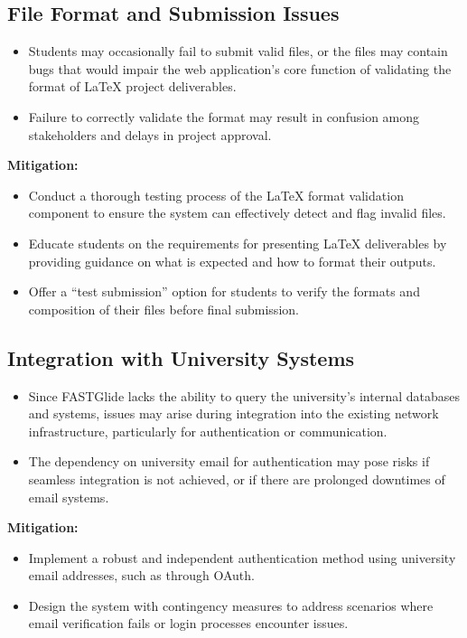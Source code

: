 \documentclass{FastFyp}
\begin{document}
\subsection{File Format and Submission Issues}
\begin{itemize}
    \item Students may occasionally fail to submit valid files, or the files may contain bugs that would impair the web application's core function of validating the format of LaTeX project deliverables.
    \item Failure to correctly validate the format may result in confusion among stakeholders and delays in project approval.
\end{itemize}
\textbf{Mitigation:}
\begin{itemize}
    \item Conduct a thorough testing process of the LaTeX format validation component to ensure the system can effectively detect and flag invalid files.
    \item Educate students on the requirements for presenting LaTeX deliverables by providing guidance on what is expected and how to format their outputs.
    \item Offer a “test submission” option for students to verify the formats and composition of their files before final submission.
\end{itemize}

\subsection{Integration with University Systems}
\begin{itemize}
    \item Since FASTGlide lacks the ability to query the university's internal databases and systems, issues may arise during integration into the existing network infrastructure, particularly for authentication or communication.
    \item The dependency on university email for authentication may pose risks if seamless integration is not achieved, or if there are prolonged downtimes of email systems.
\end{itemize}
\textbf{Mitigation:}
\begin{itemize}
    \item Implement a robust and independent authentication method using university email addresses, such as through OAuth.
    \item Design the system with contingency measures to address scenarios where email verification fails or login processes encounter issues.
\end{itemize}
\end{document}
